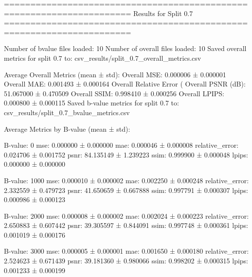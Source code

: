 ======================================================================
Results for Split 0.7
======================================================================

Number of bvalue files loaded: 10
Number of overall files loaded: 10
Saved overall metrics for split 0.7 to: csv_results/split_0.7_overall_metrics.csv

Average Overall Metrics (mean ± std):
Overall MSE: 0.000006 ± 0.000001
Overall MAE: 0.001493 ± 0.000164
Overall Relative Error (%
Overall PSNR (dB): 51.067000 ± 0.470509
Overall SSIM: 0.998410 ± 0.000256
Overall LPIPS: 0.000800 ± 0.000115
Saved b-value metrics for split 0.7 to: csv_results/split_0.7_bvalue_metrics.csv

Average Metrics by B-value (mean ± std):

B-value: 0
mse: 0.000000 ± 0.000000
mae: 0.000046 ± 0.000008
relative_error: 0.024706 ± 0.001752
psnr: 84.135149 ± 1.239223
ssim: 0.999900 ± 0.000048
lpips: 0.000000 ± 0.000000

B-value: 1000
mse: 0.000010 ± 0.000002
mae: 0.002250 ± 0.000248
relative_error: 2.332559 ± 0.479723
psnr: 41.650659 ± 0.667888
ssim: 0.997791 ± 0.000307
lpips: 0.000986 ± 0.000123

B-value: 2000
mse: 0.000008 ± 0.000002
mae: 0.002024 ± 0.000223
relative_error: 2.650883 ± 0.607442
psnr: 39.305597 ± 0.844091
ssim: 0.997748 ± 0.000361
lpips: 0.001019 ± 0.000176

B-value: 3000
mse: 0.000005 ± 0.000001
mae: 0.001650 ± 0.000180
relative_error: 2.524623 ± 0.671439
psnr: 39.181360 ± 0.980066
ssim: 0.998202 ± 0.000315
lpips: 0.001233 ± 0.000199
